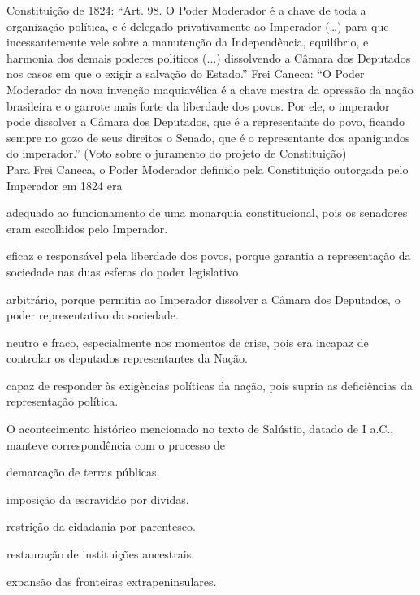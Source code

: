 \questao %
Constituição de 1824: ``Art. 98. O Poder Moderador é a chave de toda a organização política, e é delegado privativamente ao Imperador (…) para que incessantemente vele sobre a manutenção da Independência, equilíbrio, e harmonia dos demais poderes políticos (...) dissolvendo a Câmara dos Deputados nos casos em que o exigir a salvação do Estado.'' 
Frei Caneca: ``O Poder Moderador da nova invenção maquiavélica é a chave mestra da opressão da nação brasileira e o garrote mais forte da liberdade dos povos. Por ele, o imperador pode dissolver a Câmara dos Deputados, que é a representante do povo, ficando sempre no gozo de seus direitos o Senado, que é o representante dos apaniguados do imperador.'' (Voto sobre o juramento do projeto de Constituição)\\
Para Frei Caneca, o Poder Moderador definido pela Constituição outorgada pelo Imperador em 1824 era
\begin{alternativas}
\item adequado ao funcionamento de uma monarquia constitucional, pois os senadores eram escolhidos pelo Imperador. 
\item eficaz e responsável pela liberdade dos povos, porque garantia a representação da sociedade nas duas esferas do poder legislativo. 
\item arbitrário, porque permitia ao Imperador dissolver a Câmara dos Deputados, o poder representativo da sociedade.
\item neutro e fraco, especialmente nos momentos de crise, pois era incapaz de controlar os deputados representantes da Nação.
\item capaz de responder às exigências políticas da nação, pois supria as deficiências da representação política.
\end{alternativas}

\questao %
O acontecimento histórico mencionado no texto de Salústio, datado de I a.C., manteve correspondência com o processo de 
\begin{alternativas}
\item demarcação de terras públicas.   
\item imposição da escravidão por dividas.   
\item restrição da cidadania por parentesco.   
\item restauração de instituições ancestrais.   
\item expansão das fronteiras extrapeninsulares. 
\end{alternativas}

